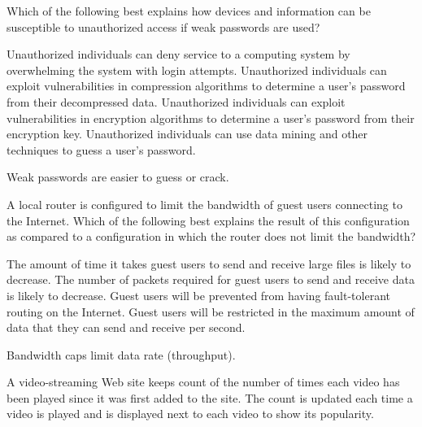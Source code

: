 \question[5]
Which of the following best explains how devices and information can be susceptible to unauthorized access if weak passwords are used?
\begin{choices}
  \choice Unauthorized individuals can deny service to a computing system by overwhelming the system with login attempts.
  \choice Unauthorized individuals can exploit vulnerabilities in compression algorithms to determine a user's password from their decompressed data.
  \choice Unauthorized individuals can exploit vulnerabilities in encryption algorithms to determine a user's password from their encryption key.
  \CorrectChoice Unauthorized individuals can use data mining and other techniques to guess a user's password.
\end{choices}
\begin{solution}
  Weak passwords are easier to guess or crack.
\end{solution}


\question[5]
A local router is configured to limit the bandwidth of guest users connecting to the Internet. Which of the following best explains the result of this configuration as compared to a configuration in which the router does not limit the bandwidth?
\begin{choices}
  \choice The amount of time it takes guest users to send and receive large files is likely to decrease.
  \choice The number of packets required for guest users to send and receive data is likely to decrease.
  \choice Guest users will be prevented from having fault-tolerant routing on the Internet.
  \CorrectChoice Guest users will be restricted in the maximum amount of data that they can send and receive per second.
\end{choices}
\begin{solution}
  Bandwidth caps limit data rate (throughput).
\end{solution}



\newpage



\question[5]
A video-streaming Web site keeps count of the number of times each video has been played since it was first added to the site. The count is updated each time a video is played and is displayed next to each video to show its popularity.

